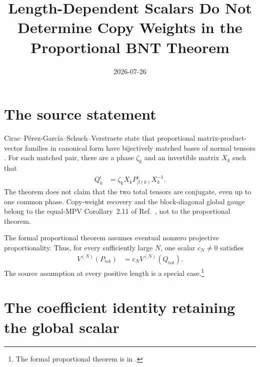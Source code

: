 \documentclass{article}
\title{Length-Dependent Scalars Do Not Determine Copy Weights in the
Proportional BNT Theorem}
\author{}
\date{2026-07-26}
\begin{document}
\maketitle
{}

\section{The source statement}

Cirac--P\'erez-Garc\'ia--Schuch--Verstraete state that proportional
matrix-product-vector families in canonical form have bijectively matched
bases of normal tensors
\cite[Theorem~2.10 and Appendix~A, lines~1167--1183]
{Cirac2016MPDO_arXiv}. For each matched pair, there are a phase $\zeta_k$ and
an invertible matrix $X_k$ such that
\begin{align}
    Q_k^i
        &=\zeta_kX_kP_{\beta(k)}^iX_k^{-1}.
    \label{eq:cpsv16_proportional_length_scalar_gap_sector_match}
\end{align}
The theorem does not claim that the two total tensors are conjugate, even up
to one common phase. Copy-weight recovery and the block-diagonal global gauge
belong to the equal-MPV Corollary~2.11 of
Ref.~\cite{Cirac2016MPDO_arXiv}, not to the proportional theorem.

The formal proportional theorem assumes eventual nonzero projective
proportionality. Thus, for every sufficiently large $N$, one scalar
$c_N\neq 0$ satisfies
\begin{align}
    V^{(N)}(P_{\mathrm{tot}})
        &=c_NV^{(N)}(Q_{\mathrm{tot}}).
    \label{eq:cpsv16_proportional_length_scalar_gap_total_proportionality}
\end{align}
The source assumption at every positive length is a special case.\footnote{The
formal proportional theorem is
 in
.}

\section{The coefficient identity retaining the global scalar}
\end{document}
